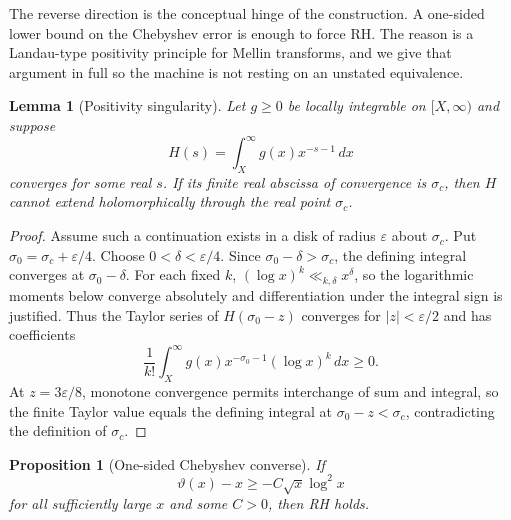 \documentclass[10pt]{article}
\newtheorem{lemma}[theorem]{Lemma}
\newtheorem{proposition}[theorem]{Proposition}
\theoremstyle{definition}
\newcommand{\tht}{\vartheta}
\begin{document}
The reverse direction is the conceptual hinge of the construction. A one-sided
lower bound on the Chebyshev error is enough to force RH. The reason is a
Landau-type positivity principle for Mellin transforms, and we give that
argument in full so the machine is not resting on an unstated equivalence.

\begin{lemma}[Positivity singularity]
\label{lem:landau}
Let $g\ge0$ be locally integrable on $[X,\infty)$ and suppose
\[
H(s)=\int_X^\infty g(x)x^{-s-1}\,dx
\]
converges for some real $s$. If its finite real abscissa of convergence is
$\sigma_c$, then $H$ cannot extend holomorphically through the real point
$\sigma_c$.
\end{lemma}

\begin{proof}
Assume such a continuation exists in a disk of radius $\varepsilon$ about
$\sigma_c$. Put $\sigma_0=\sigma_c+\varepsilon/4$. Choose
$0<\delta<\varepsilon/4$. Since $\sigma_0-\delta>\sigma_c$, the defining
integral converges at $\sigma_0-\delta$. For each fixed $k$,
$(\log x)^k\ll_{k,\delta}x^\delta$, so the logarithmic moments below converge
absolutely and differentiation under the integral sign is justified. Thus the
Taylor series of $H(\sigma_0-z)$ converges for $|z|<\varepsilon/2$ and has
coefficients
\[
\frac1{k!}\int_X^\infty g(x)x^{-\sigma_0-1}(\log x)^k\,dx\ge0.
\]
At $z=3\varepsilon/8$, monotone convergence permits interchange of sum and
integral, so the finite Taylor value equals the defining integral at
$\sigma_0-z<\sigma_c$, contradicting the definition of $\sigma_c$.
\end{proof}

\begin{proposition}[One-sided Chebyshev converse]
\label{prop:onewall}
If
\begin{equation}
\label{eq:onewall}
\tht(x)-x\ge -C\sqrt{x}\log^2x
\end{equation}
for all sufficiently large $x$ and some $C>0$, then RH holds.
\end{proposition}
\end{document}
